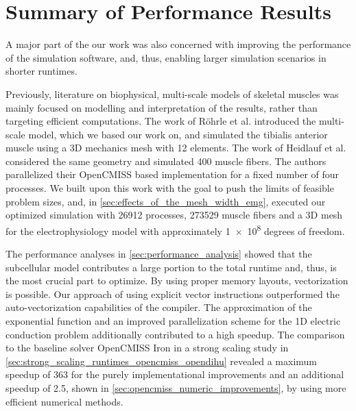 
\section{Summary of Performance Results}\label{sec:observations_performance}

A major part of the our work was also concerned with improving the performance of the simulation software, and, thus, enabling larger simulation scenarios in shorter runtimes.

Previously, literature on biophysical, multi-scale models of skeletal muscles was mainly focused on modelling and interpretation of the results, rather than targeting efficient computations. The work of Röhrle et al. \cite{Roehrle2012} introduced the multi-scale model, which we based our work on, and simulated the tibialis anterior muscle using a 3D mechanics mesh with 12 elements. The work of Heidlauf et al. \cite{Heidlauf2013} considered the same geometry and simulated 400 muscle fibers. The authors parallelized their OpenCMISS based implementation for a fixed number of four processes. We built upon this work with the goal to push the limits of feasible problem sizes, and, in \cref{sec:effects_of_the_mesh_width_emg}, executed our optimized simulation with \num{26912} processes, \num{273529} muscle fibers and a 3D mesh for the electrophysiology model with approximately \num{1e8} degrees of freedom.

The performance analyses in \cref{sec:performance_analysis} showed that the subcellular model contributes a large portion to the total runtime and, thus, is the most crucial part to optimize. By using proper memory layouts, vectorization is possible. Our approach of using explicit vector instructions outperformed the auto-vectorization capabilities of the compiler. The approximation of the exponential function and an improved parallelization scheme for the 1D electric conduction problem additionally contributed to a high speedup. The comparison to the baseline solver OpenCMISS Iron in a strong scaling study in \cref{sec:strong_scaling_runtimes_opencmiss_opendihu} revealed a maximum speedup of 363 for the purely implementational improvements and an additional speedup of 2.5, shown in \cref{sec:opencmiss_numeric_improvements}, by using more efficient numerical methods.

